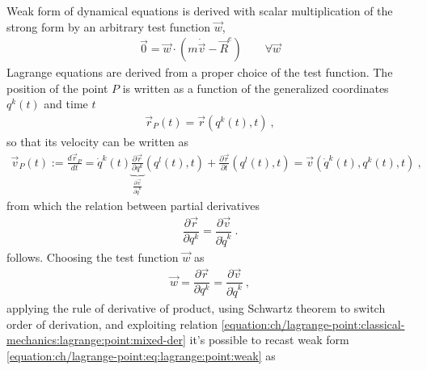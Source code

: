 \documentclass[letterpaper,10pt,english]{jupyterBook}
\begin{document}
\sphinxAtStartPar
{} Weak form of dynamical equations is derived with scalar multiplication of the strong form by an arbitrary test function \(\vec{w}\),
\begin{equation}\label{equation:ch/lagrange-point:eq:lagrange:point:weak}
\begin{split}\vec{0} = \vec{w} \cdot \left( m \dot{\vec{v}} - \vec{R}^e\right)  \qquad \forall \vec{w}\end{split}
\end{equation}
\sphinxAtStartPar
{} Lagrange equations are derived from a proper choice of the test function. The position of the point \(P\) is written as a function of the generalized coordinates \(q^k(t)\) and time \(t\)
\begin{equation*}
\begin{split}\vec{r}_P(t) = \vec{r}(q^k(t),t) \ ,\end{split}
\end{equation*}
\sphinxAtStartPar
so that its velocity can be written as
\begin{equation*}
\begin{split}\vec{v}_P(t) := \frac{d\vec{r}_P}{dt} = \dot{q}^k(t) \underbrace{\frac{\partial \vec{r}}{\partial q^k}}_{\frac{\partial \vec{v}}{\partial \dot{q}^k}}(q^l(t), t) + \frac{\partial \vec{r}}{\partial t}(q^l(t), t) = \vec{v}\left(\dot{q}^k(t), q^k(t), t \right) \ ,\end{split}
\end{equation*}
\sphinxAtStartPar
from which the relation between partial derivatives
\begin{equation}\label{equation:ch/lagrange-point:classical-mechanics:lagrange:point:mixed-der}
\begin{split}\dfrac{\partial \vec{r}}{\partial q^k} = \dfrac{\partial \vec{v}}{\partial \dot{q}^k} \ .\end{split}
\end{equation}
\sphinxAtStartPar
follows. Choosing the test function \(\vec{w}\) as
\begin{equation*}
\begin{split}\vec{w} = \dfrac{\partial \vec{r}}{\partial q^k} = \dfrac{\partial \vec{v}}{\partial \dot{q}^k} \ ,\end{split}
\end{equation*}
\sphinxAtStartPar
applying the rule of derivative of product, using Schwartz theorem to switch order of derivation, and exploiting relation \eqref{equation:ch/lagrange-point:classical-mechanics:lagrange:point:mixed-der} it’s possible to recast weak form \eqref{equation:ch/lagrange-point:eq:lagrange:point:weak} as
\end{document}
